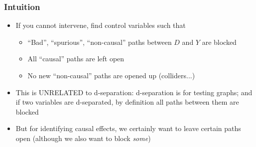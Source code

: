 \documentclass{beamer}
\begin{document}
\begin{frame}[t]
\frametitle{Intuition}
\begin{figure}[ht]
\centering
{}
\end{figure}
\begin{itemize}
\item<1-> If you cannot intervene, find control variables such that
\begin{itemize}
	\item<1-> ``Bad'', ``spurious'', ``non-causal'' paths between $D$ and $Y$ are blocked
	\item<1-> All ``causal'' paths are left open
	\item<1-> No new ``non-causal'' paths are opened up (colliders...)
\end{itemize}
\item<2-> This is UNRELATED to d-separation: d-separation is for testing graphs; and if two variables are d-separated, by definition all paths between them are blocked
\item<3-> But for identifying causal effects, we certainly want to leave certain paths open (although we also want to block \textit{some})

\end{itemize}
\end{frame}
\end{document}
